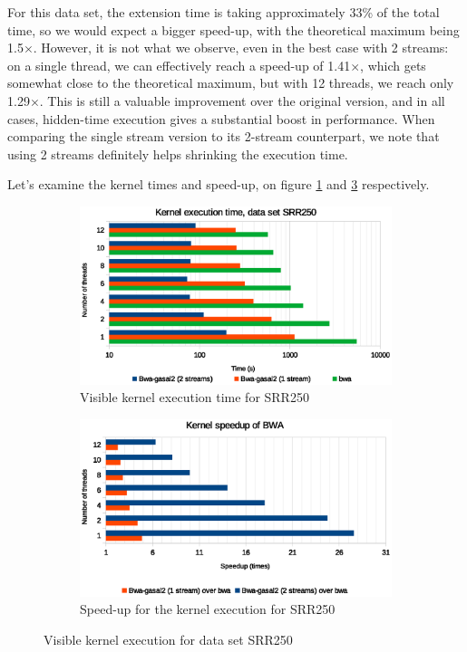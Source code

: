 For this data set, the extension time is taking approximately 33\% of the total time, so we would expect a bigger speed-up, with the theoretical maximum being 1.5$\times$. However, it is not what we observe, even in the best case with 2 streams: on a single thread, we can effectively reach a speed-up of 1.41$\times$, which gets somewhat close to the theoretical maximum, but with 12 threads, we reach only 1.29$\times$. This is still a valuable improvement over the original version, and in all cases, hidden-time execution gives a substantial boost in performance. When comparing the single stream version to its 2-stream counterpart, we note that using 2 streams definitely helps shrinking the execution time.

Let's examine the kernel times and speed-up, on figure \ref{fig:kernel-exec-time-srr250} and \ref{fig:kernel-exec-speed-up-srr250} respectively.


\begin{figure}[p]
	\centering
	\begin{subfigure}[t]{1\textwidth}
		\centering
		\includegraphics[width=1\textwidth]{srr250/kernel-exec-time-srr250}
		\caption{Visible kernel execution time for SRR250}
		\label{fig:kernel-exec-time-srr250}
	\end{subfigure}%
	
	\begin{subfigure}[b]{1\textwidth}
		\centering
		\includegraphics[width=1\textwidth]{srr250/kernel-exec-speed-up-srr250}
		\caption{Speed-up for the kernel execution for SRR250}
		\label{fig:kernel-exec-speed-up-srr250}
	\end{subfigure}
	\caption{Visible kernel execution for data set SRR250}
\end{figure}

